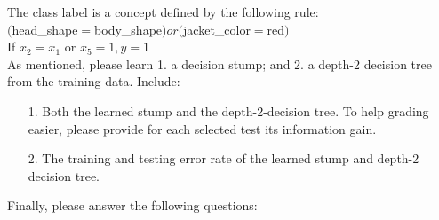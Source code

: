 \documentclass[12pt,letterpaper]{article}
\begin{document}
The class label is a concept defined by the following rule: \\
$($head\_shape$ = $body\_shape$) or ($jacket\_color$ = $red$)$ \\
If $x_{2} = x_{1}$ or $x_{5} = 1, y = 1$ \\
As mentioned, please learn 1. a decision stump; and 2. a depth-2 decision tree from the training data. Include: \\
\begin{enumerate} 
	\item[1.] Both the learned stump and the depth-2-decision tree. To help grading easier, please provide for each selected test its information gain.  
	\item[2.] The training and testing error rate of the learned stump and depth-2 decision tree. 
\end{enumerate} 
Finally, please answer the following questions: 
\end{document}
